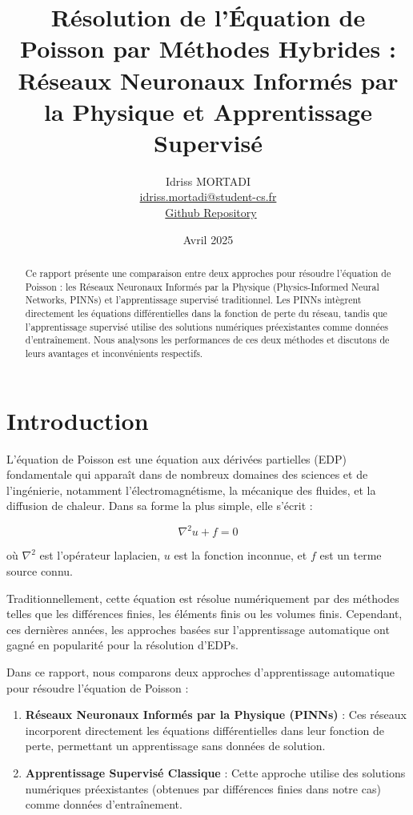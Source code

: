 \documentclass[11pt,a4paper]{article}
\title{Résolution de l'Équation de Poisson par Méthodes Hybrides : \\
Réseaux Neuronaux Informés par la Physique et Apprentissage Supervisé}
\author{Idriss MORTADI \\ \href{mailto:idriss.mortadi@student-cs.fr}{idriss.mortadi@student-cs.fr} \\ 
\faGithub~\href{https://github.com/idrissmortadi/cs-hybrid-ai-tp}{Github Repository}}
\date{Avril 2025}
\begin{document}
\maketitle

\begin{abstract}
    Ce rapport présente une comparaison entre deux approches pour résoudre l'équation de Poisson : les Réseaux Neuronaux Informés par la Physique (Physics-Informed Neural Networks, PINNs) et l'apprentissage supervisé traditionnel. Les PINNs intègrent directement les équations différentielles dans la fonction de perte du réseau, tandis que l'apprentissage supervisé utilise des solutions numériques préexistantes comme données d'entraînement. Nous analysons les performances de ces deux méthodes et discutons de leurs avantages et inconvénients respectifs.
\end{abstract}

\tableofcontents

\newpage
\section{Introduction}

L'équation de Poisson est une équation aux dérivées partielles (EDP) fondamentale qui apparaît dans de nombreux domaines des sciences et de l'ingénierie, notamment l'électromagnétisme, la mécanique des fluides, et la diffusion de chaleur. Dans sa forme la plus simple, elle s'écrit :

\begin{equation}
    \nabla^2 u + f = 0
\end{equation}

où $\nabla^2$ est l'opérateur laplacien, $u$ est la fonction inconnue, et $f$ est un terme source connu.

Traditionnellement, cette équation est résolue numériquement par des méthodes telles que les différences finies, les éléments finis ou les volumes finis. Cependant, ces dernières années, les approches basées sur l'apprentissage automatique ont gagné en popularité pour la résolution d'EDPs.

Dans ce rapport, nous comparons deux approches d'apprentissage automatique pour résoudre l'équation de Poisson :
\begin{enumerate}
    \item \textbf{Réseaux Neuronaux Informés par la Physique (PINNs)} : Ces réseaux incorporent directement les équations différentielles dans leur fonction de perte, permettant un apprentissage sans données de solution.
    \item \textbf{Apprentissage Supervisé Classique} : Cette approche utilise des solutions numériques préexistantes (obtenues par différences finies dans notre cas) comme données d'entraînement.
\end{enumerate}
\end{document}
